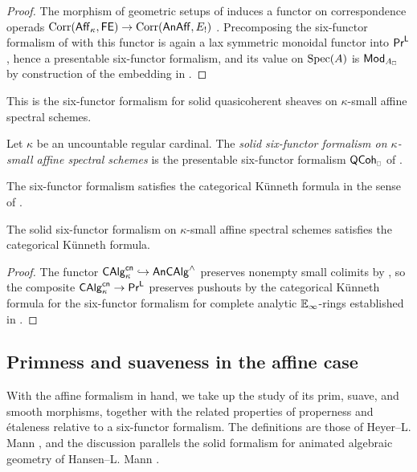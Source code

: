 \begin{proof}
    The morphism of geometric setups of  induces a functor on correspondence operads $\mathrm{Corr}(\mathsf{Aff}_{\kappa},\mathsf{FE})\to\mathrm{Corr}(\mathsf{An}\mathsf{Aff},E_{!})$ \cite[Prop. 2.3.5 \& 2.3.6]{HeyerMann6FF}. Precomposing the six-functor formalism of  with this functor is again a lax symmetric monoidal functor into $\mathsf{Pr}^{\mathsf{L}}$, hence a presentable six-functor formalism, and its value on $\operatorname{Spec}(A)$ is $\Mod_{A_{\sld}}$ by construction of the embedding in .
\end{proof}
This is the six-functor formalism for solid quasicoherent sheaves on $\kappa$-small affine spectral schemes. 
\begin{definition}\label{def: solid six-functor formalism affine}
    Let $\kappa$ be an uncountable regular cardinal. The \emph{solid six-functor formalism on $\kappa$-small affine spectral schemes} is the presentable six-functor formalism $\QCoh_{\sld}$ of .
\end{definition}
The six-functor formalism satisfies the categorical K\"{u}nneth formula in the sense of . 
\begin{corollary}\label{cor: solid six functor formalism affine satisfies categorical kunneth}
    The solid six-functor formalism on $\kappa$-small affine spectral schemes satisfies the categorical K\"{u}nneth formula. 
\end{corollary}
\begin{proof}
    The functor $\mathsf{CAlg}_{\kappa}^{\mathsf{cn}}\hookrightarrow\mathsf{An}\mathsf{CAlg}^{\wedge}$ preserves nonempty small colimits by , so the composite $\mathsf{CAlg}^{\mathsf{cn}}_{\kappa}\to\mathsf{Pr}^{\mathsf{L}}$ preserves pushouts by the categorical K\"{u}nneth formula for the six-functor formalism for complete analytic $\mathbb{E}_{\infty}$-rings established in . 
\end{proof}
\subsection{Primness and suaveness in the affine case}\label{subsec: affine prim and suave}
With the affine formalism in hand, we take up the study of its prim, suave, and smooth morphisms, together with the related properties of properness and \'{e}taleness relative to a six-functor formalism. The definitions are those of Heyer--L. Mann \cite[\S 4.4-4.6]{HeyerMann6FF}, and the discussion parallels the solid formalism for animated algebraic geometry of Hansen--L. Mann \cite[\S 2.7]{HansenMannCLL}.

